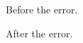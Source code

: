 \documentclass{article}
\begin{document}
Before the error.

\undefinedmacroforthetest

After the error.
\end{document}
